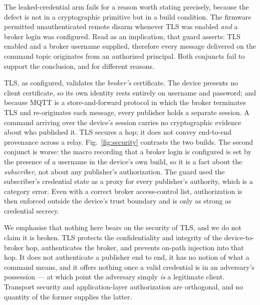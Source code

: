 The leaked-credential arm fails for a reason worth stating precisely, because the defect is not
in a cryptographic primitive but in a build condition. The firmware permitted unauthenticated
remote disarm whenever TLS was enabled \emph{and} a broker login was configured. Read as an
implication, that guard asserts: TLS enabled and a broker username supplied, therefore every
message delivered on the command topic originates from an authorized principal. Both conjuncts
fail to support the conclusion, and for different reasons.

TLS, as configured, validates the \emph{broker's} certificate. The device presents no client
certificate, so its own identity rests entirely on username and password; and because MQTT is a
store-and-forward protocol in which the broker terminates TLS and re-originates each message,
every publisher holds a separate session. A command arriving over the device's session carries
no cryptographic evidence about who published it. TLS secures a hop; it does not convey
end-to-end provenance across a relay. Fig.~\ref{fig:security} contrasts the two builds. The second conjunct is worse: the macro recording that a
broker login is configured is set by the presence of a username in the device's own build, so it
is a fact about the \emph{subscriber}, not about any publisher's authorization. The guard used
the subscriber's credential state as a proxy for every publisher's authority, which is a
category error. Even with a correct broker access-control list, authorization is then enforced
outside the device's trust boundary and is only as strong as credential secrecy.

We emphasise that nothing here bears on the security of TLS, and we do not claim it is broken.
TLS protects the confidentiality and integrity of the device-to-broker hop, authenticates the
broker, and prevents on-path injection into that hop. It does not authenticate a publisher end
to end, it has no notion of what a command means, and it offers nothing once a valid credential
is in an adversary's possession --- at which point the adversary simply \emph{is} a legitimate
client. Transport security and application-layer authorization are orthogonal, and no quantity
of the former supplies the latter.

